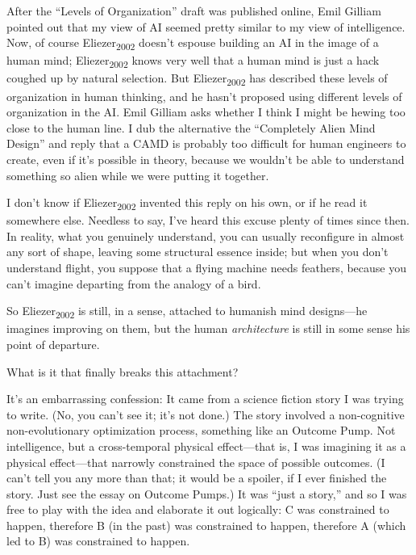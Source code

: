 {
 After the ``Levels of
Organization'' draft was published online, Emil
Gilliam pointed out that my view of AI seemed pretty similar to my view
of intelligence. Now, of course Eliezer\textsubscript{2002}
doesn't espouse building an AI in the image of a human
mind; Eliezer\textsubscript{2002} knows very well that a human mind is
just a hack coughed up by natural selection. But
Eliezer\textsubscript{2002} has described these levels of organization
in human thinking, and he hasn't proposed using
different levels of organization in the AI. Emil Gilliam asks whether I
think I might be hewing too close to the human line. I dub the
alternative the ``Completely Alien Mind
Design'' and reply that a CAMD is probably too
difficult for human engineers to create, even if it's
possible in theory, because we wouldn't be able to
understand something so alien while we were putting it together.}

{
 I don't know if Eliezer\textsubscript{2002}
invented this reply on his own, or if he read it somewhere else.
Needless to say, I've heard this excuse plenty of times
since then. In reality, what you genuinely understand, you can usually
reconfigure in almost any sort of shape, leaving some structural
essence inside; but when you don't understand flight,
you suppose that a flying machine needs feathers, because you
can't imagine departing from the analogy of a bird.}

{
 So Eliezer\textsubscript{2002} is still, in a sense, attached to
humanish mind designs---he imagines improving on them, but the human
\textit{architecture} is still in some sense his point of departure.}

{
 What is it that finally breaks this attachment?}

{
 It's an embarrassing confession: It came from a
science fiction story I was trying to write. (No, you
can't see it; it's not done.) The story
involved a non-cognitive non-evolutionary optimization process,
something like an Outcome Pump. Not intelligence, but a cross-temporal
physical effect---that is, I was imagining it as a physical
effect---that narrowly constrained the space of possible outcomes. (I
can't tell you any more than that; it would be a
spoiler, if I ever finished the story. Just see the essay on Outcome
Pumps.) It was ``just a story,'' and
so I was free to play with the idea and elaborate it out logically: C
was constrained to happen, therefore B (in the past) was constrained to
happen, therefore A (which led to B) was constrained to happen.}

